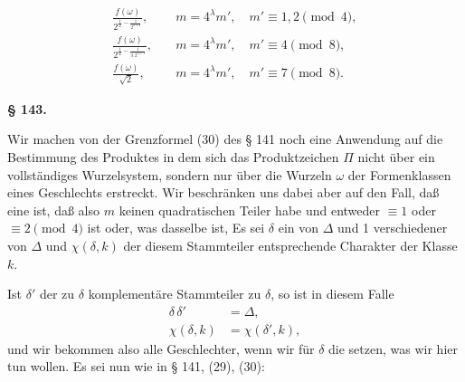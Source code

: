 
\[
\begin{aligned}
\frac{f(\omega)}{2^{\frac{1}{2} - \frac{1}{2^{\lambda+2}}}}, & \quad m = 4^\lambda m', \quad m' \equiv 1, 2 \pmod 4, \\
\frac{f(\omega)}{2^{\frac{1}{2} - \frac{1}{3.\,2^{\lambda+1}}}}, & \quad m = 4^\lambda m', \quad m' \equiv 4 \pmod 8, \\
\frac{f(\omega)}{\sqrt{2}}, & \quad m = 4^\lambda m', \quad m' \equiv 7 \pmod 8.
\end{aligned}
\]

\begin{center}
\textbf{§ 143.\quad {}}
\end{center}

Wir machen von der Grenzformel (30) des § 141 noch eine
Anwendung auf die Bestimmung des Produktes
in dem sich das Produktzeichen $\Pi$ nicht über ein vollständiges
Wurzelsystem, sondern nur über die Wurzeln $\omega$ der Formenklassen
eines Geschlechts erstreckt. Wir beschränken uns dabei aber
auf den Fall, daß
eine  ist, daß also $m$ keinen quadratischen
Teiler habe und entweder $\equiv 1$ oder $\equiv 2 \pmod 4$ ist oder, was
dasselbe ist,
Es sei $\delta$ ein von $\Delta$ und 1 verschiedener  von
$\Delta$ und $\chi(\delta, k)$ der diesem Stammteiler entsprechende Charakter
der Klasse $k$.

Ist $\delta'$ der zu $\delta$ komplementäre Stammteiler zu $\delta$, so ist in
diesem Falle
\[
\begin{aligned}
\delta\,\delta' &= \Delta, \\
\chi(\delta, k) &= \chi(\delta', k),
\end{aligned}
\]
und wir bekommen also alle Geschlechter, wenn wir für $\delta$ die
 setzen, was wir hier tun wollen. Es sei
nun wie in § 141, (29), (30):
